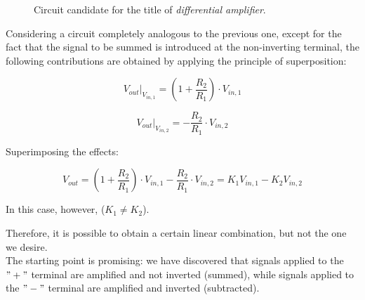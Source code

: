 \documentclass[../main.tex]{subfiles}
\begin{document}
\begin{figure}[h!]
\begin{center}


\caption{Circuit candidate for the title of \textit{differential amplifier}.}
\label{diffop}	
\end{center}	
\end{figure}

Considering a circuit completely analogous to the previous one, except for the fact that the signal to be summed is introduced at the non-inverting terminal, the following contributions are obtained by applying the principle of superposition:

\begin{equation}
	V_{out} \big|_{V_{in,1}} = \left( 1 + \frac{R_2}{R_1} \right) \cdot V_{in,1}
\end{equation}


\begin{equation}
	V_{out} \big|_{V_{in,2}} = - \frac{R_2}{R_1} \cdot V_{in,2}
\end{equation}

Superimposing the effects:

\begin{equation}
	V_{out} = \left( 1 + \frac{R_2}{R_1} \right) \cdot V_{in,1} - \frac{R_2}{R_1} \cdot V_{in,2} = K_1 V_{in,1} - K_2 V_{in,2} 
\end{equation}

In this case, however, ($K_1 \neq K_2$). 

Therefore, it is possible to obtain a certain linear combination, but not the one we desire.\\

The starting point is promising: we have discovered that signals applied to the $"+"$ terminal are amplified and not inverted (summed), while signals applied to the $"-"$ terminal are amplified and inverted (subtracted). 
\end{document}
